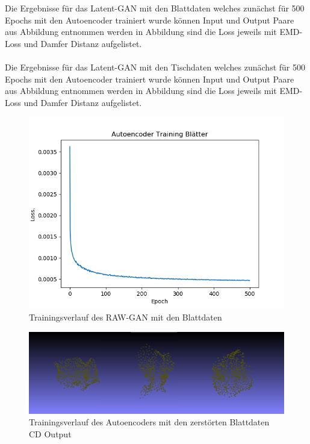 \documentclass{llncs}
\begin{document}
Die Ergebnisse für das Latent-GAN mit den Blattdaten welches zunächst für 500 Epochs mit den Autoencoder trainiert wurde können Input und Output Paare aus Abbildung entnommen werden in Abbildung sind die Loss jeweils mit EMD-Loss und Damfer Distanz aufgelistet.
\\\\
Die Ergebnisse für das Latent-GAN mit den Tischdaten welches zunächst für 500 Epochs mit den Autoencoder trainiert wurde können Input und Output Paare aus Abbildung entnommen werden in Abbildung sind die Loss jeweils mit EMD-Loss und Damfer Distanz aufgelistet.
\begin{figure}[htbp] 
	\centering
	\includegraphics[width=1.2\textwidth]{autoencoder_training_blaetter_result.png}
	\caption{Trainingsverlauf des RAW-GAN mit den Blattdaten}
	\label{fig:Bild42}
\end{figure}

\begin{figure}[htbp] 
	\centering
	\includegraphics[width=1.2\textwidth]{autoencoder_destroyed_example_chamfer_fake.png}
	\caption{Trainingsverlauf des Autoencoders mit den zerstörten Blattdaten CD Output}
	\label{fig:Bild43}
\end{figure}
\end{document}
